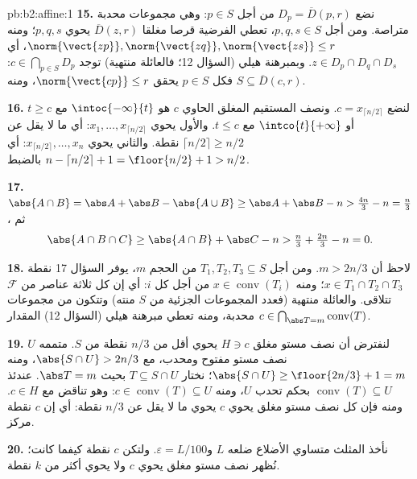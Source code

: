 \begin{solution}{pb:b2:affine:1}
\textbf{15.} نضع $D_p = \overline D(p, r)$ من أجل $p \in S$: وهي مجموعات محدبة متراصة.
ومن أجل $p, q, s \in S$، تعطي الفرضية قرصا مغلقا $\overline D(z, r)$ يحوي $p, q, s$؛ ومنه
$\norm{\vect{zp}}, \norm{\vect{zq}}, \norm{\vect{zs}}
\leq r$، أي $z \in D_p \cap D_q \cap D_s$. وبمبرهنة هيلي (السؤال 12؛ فالعائلة منتهية) توجد
$c \in
\bigcap_{p \in S}D_p$: فكل $p \in S$ يحقق $\norm{\vect{cp}} \leq r$، ومنه $S \subseteq \overline D(c,
r)$.

\textbf{16.} لنضع $c = x_{\lceil n/2\rceil}$. ونصف المستقيم المغلق الحاوي $c$ هو
$\intoc{-\infty}{t}$ مع $t \geq
c$ أو $\intco{t}{+\infty}$ مع $t \leq c$. والأول يحوي $x_1, \dots, x_{\lceil n/2\rceil}$: أي ما
لا يقل عن $\lceil n/2\rceil \geq n/2$ نقطة. والثاني يحوي $x_{\lceil n/2\rceil}, \dots, x_n$: أي $n - \lceil
n/2\rceil + 1 = \floor{n/2} + 1 > n/2$ بالضبط.

\textbf{17.} $\abs{A \cap B} = \abs A + \abs B - \abs{A \cup
B} \geq \abs A + \abs B - n > \tfrac{4n}3 - n = \tfrac n3$، ثم
\[
\abs{A \cap B \cap C} \geq \abs{A \cap B} + \abs C - n >
\tfrac n3 + \tfrac{2n}3 - n = 0 .
\]

\textbf{18.} لاحظ أن $m > 2n/3$. ومن أجل $T_1, T_2, T_3 \subseteq S$ من الحجم $m$، يوفر
السؤال 17 نقطة $x \in T_1
\cap T_2 \cap T_3$؛ ومنه $x \in \operatorname{conv}(T_i)$ من أجل كل $i$: أي إن كل
ثلاثة عناصر من $\mathcal F$ تتلاقى. والعائلة منتهية (فعدد المجموعات
الجزئية من $S$ منته) وتتكون من مجموعات محدبة، ومنه تعطي مبرهنة
هيلي (السؤال 12) المقدار $c \in
\bigcap_{\abs T = m}\operatorname{conv}(T)$.

\textbf{19.} لنفترض أن نصف مستو مغلق $H \ni c$ يحوي أقل من $n/3$ نقطة
من $S$. متممه $U$ نصف مستو مفتوح ومحدب، مع $\abs{S \cap U} > 2n/3$، ومنه
$\abs{S \cap U} \geq \floor{2n/3} + 1 = m$؛ نختار $T
\subseteq S \cap U$ بحيث $\abs T = m$. عندئذ $\operatorname{conv}(T) \subseteq U$ بحكم تحدب $U$،
ومنه $c \in \operatorname{conv}(T) \subseteq U$: وهو تناقض مع $c \in H$. ومنه فإن كل نصف مستو مغلق يحوي
$c$ يحوي ما لا يقل عن $n/3$ نقطة: أي إن $c$ نقطة مركز.

\textbf{20.} نأخذ المثلث متساوي الأضلاع ضلعه $L$ و$\varepsilon = L/100$. ولتكن
$c$ نقطة كيفما كانت؛ نُظهر نصف مستو مغلق يحوي $c$ ولا يحوي
أكثر من $k$ نقطة.


\end{solution}
